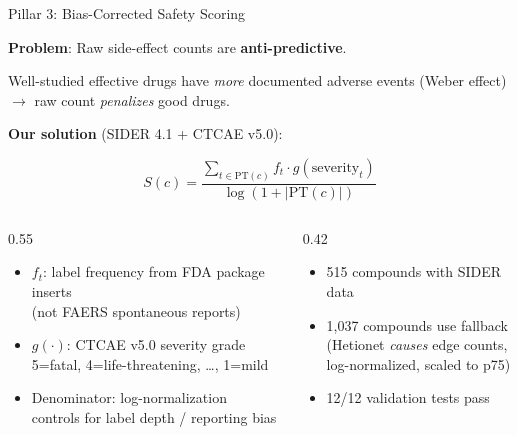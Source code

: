 \documentclass[aspectratio=169,11pt]{beamer}
\begin{document}
\begin{frame}{Pillar 3: Bias-Corrected Safety Scoring}

\textbf{Problem}: Raw side-effect counts are \textbf{anti-predictive}.

\vspace{0.3em}

{\small Well-studied effective drugs have \emph{more} documented adverse events
(Weber effect) $\to$ raw count \emph{penalizes} good drugs.}

\vspace{0.8em}

\textbf{Our solution} (SIDER 4.1 + CTCAE v5.0):

\[
\boxed{
S(c) = \frac{\displaystyle\sum_{t \in \text{PT}(c)} f_t \cdot g(\text{severity}_t)}
{\log(1 + |\text{PT}(c)|)}
}
\]

\vspace{0.3em}

\begin{columns}[T]
\begin{column}{0.55\textwidth}
\begin{itemize}
    \item $f_t$: label frequency from FDA package inserts\\
          {\scriptsize (not FAERS spontaneous reports)}
    \item $g(\cdot)$: CTCAE v5.0 severity grade\\
          {\scriptsize 5=fatal, 4=life-threatening, \ldots, 1=mild}
    \item Denominator: log-normalization\\
          {\scriptsize controls for label depth / reporting bias}
\end{itemize}
\end{column}
\begin{column}{0.42\textwidth}
\begin{itemize}
    \item 515 compounds with SIDER data
    \item 1,037 compounds use fallback\\
          {\scriptsize (Hetionet \emph{causes} edge counts,\\log-normalized, scaled to p75)}
    \item 12/12 validation tests pass
\end{itemize}
\end{column}
\end{columns}

\end{frame}
\end{document}

